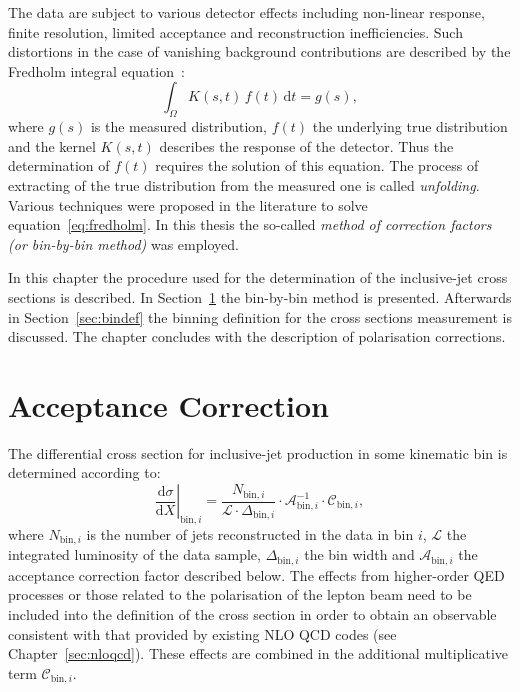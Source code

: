 The data are subject to various detector effects including non-linear response, finite resolution, limited acceptance and reconstruction inefficiencies. Such distortions in the case of vanishing background contributions are described by the Fredholm integral equation~\cite{Behnke:2013pga}:
\begin{equation}
 \int_\Omega K\left(s,t\right)\,f\left(t\right)\,\mathrm{d}t = g\left(s\right),
 \label{eq:fredholm}
\end{equation}
where $g\left(s\right)$ is the measured distribution, $f\left(t\right)$ the underlying true distribution and the kernel $K\left(s,t\right)$ describes the response of the detector. Thus the determination of $f\left(t\right)$ requires the solution of this equation.
The process of extracting of the true distribution from the measured one is called \emph{unfolding}. Various techniques were proposed in the literature to solve equation~\ref{eq:fredholm}. In this thesis the so-called \emph{method of correction factors (or bin-by-bin method)} was employed.

In this chapter the procedure used for the determination of the inclusive-jet cross sections is described. In Section~\ref{sec:acccor} the bin-by-bin method is presented. Afterwards in Section~\ref{sec:bindef} the binning definition for the cross sections measurement is discussed. The chapter concludes with the description of polarisation corrections.

\section{Acceptance Correction}
\label{sec:acccor}
The differential cross section for inclusive-jet production in some kinematic bin is determined according to:
\begin{equation}
 \left.\frac{\mathrm{d}\sigma}{\mathrm{d}X}\right|_{\mathrm{bin},i} = \frac{N_{\mathrm{bin},i}}{\mathcal{L} \cdot \Delta_{\mathrm{bin},i}} \cdot \mathcal{A}^{-1}_{\mathrm{bin},i} \cdot \mathcal{C}_{\mathrm{bin},i},
 \label{eq:csdef}
\end{equation}
where $N_{\mathrm{bin},i}$ is the number of jets reconstructed in the data in bin $i$, $\mathcal{L}$ the integrated luminosity of the data sample, $\Delta_{\mathrm{bin},i}$ the bin width and $\mathcal{A}_{\mathrm{bin},i}$ the acceptance correction factor described below. The effects from higher-order QED processes or those related to the polarisation of the lepton beam need to be included into the definition of the cross section in order to obtain an observable consistent with that provided by existing NLO QCD codes (see Chapter~\ref{sec:nloqcd}). These effects are combined in the additional multiplicative term $\mathcal{C}_{\mathrm{bin},i}$.

